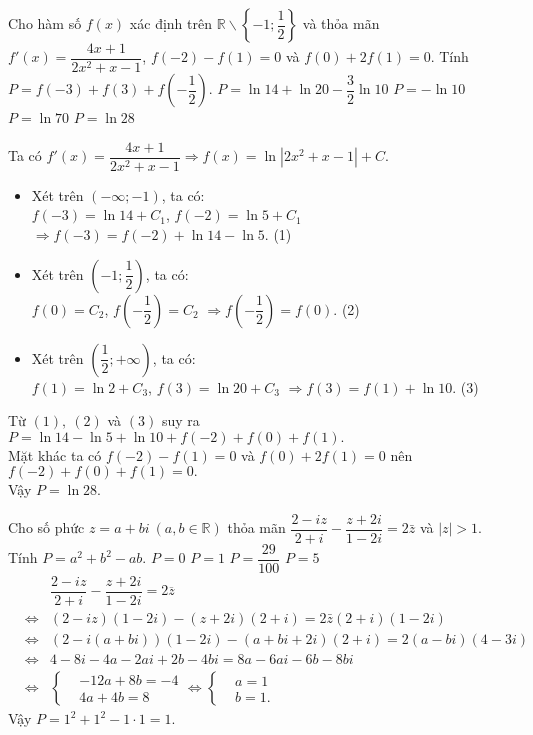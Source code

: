 \documentclass[12pt,a4paper,oneside]{book}
\newcommand{\heva}[1]{
	\left\{\begin{aligned}#1\end{aligned}\right.}
\begin{document}
\begin{ex}%
Cho hàm số $ f(x) $ xác định trên $ \mathbb{R} \backslash \left\{-1;\dfrac{1}{2}\right\} $ và thỏa mãn $ f'(x)=\dfrac{4x+1}{2x^2+x-1} $, $ f(-2)-f(1)=0 $ và $ f(0)+2f(1)=0. $ Tính $ P = f(-3)+f(3)+f\left(-\dfrac{1}{2}\right) $.
	\choice
	{$ P = \ln 14 + \ln 20 - \dfrac{3}{2}\ln 10 $}
	{$ P = -\ln 10 $}
	{$ P =\ln 70 $}
	{\True $ P = \ln 28 $}
	\loigiai
	{Ta có $ f'(x)=\dfrac{4x+1}{2x^2+x-1} \Rightarrow f(x) = \ln \left|2x^2+x-1\right| +C.$
		\begin{itemize}
			\item Xét trên $ \left(-\infty;-1\right) $, ta có:\\
			$ f(-3)=\ln 14 +C_1 $, $ f(-2)=\ln 5 + C_1 $ $ \Rightarrow f(-3) = f(-2) + \ln 14 - \ln 5. $ \hfill (1)
			\item Xét trên $ \left(-1;\dfrac{1}{2}\right) $, ta có:\\
			$ f(0)=C_2 $, $ f\left(-\dfrac{1}{2}\right)= C_2 $ $ \Rightarrow f\left(-\dfrac{1}{2}\right) = f(0). $ \hfill (2)
			\item Xét trên $ \left(\dfrac{1}{2};+\infty\right) $, ta có:\\
			$ f(1)=\ln 2 +C_3 $, $ f(3)=\ln 20 + C_3 $ $ \Rightarrow f(3) = f(1) + \ln 10. $ \hfill (3)
		\end{itemize}
Từ $ (1),\ (2) $ và $ (3) $ suy ra $ P = \ln 14 - \ln 5 + \ln 10 + f(-2) + f(0) + f(1). $\\
Mặt khác ta có $ f(-2)-f(1)=0 $ và $ f(0)+2f(1)=0 $ nên $ f(-2)+f(0)+f(1) = 0. $\\
Vậy $ P = \ln 28.  $
	}
\end{ex}
\begin{ex}%
Cho số phức	$ z = a+bi \ (a,b \in \mathbb{R}) $ thỏa mãn $ \dfrac{2-iz}{2+i}-\dfrac{z+2i}{1-2i}=2 \bar{z} $ và $ \left|z\right| >1$. Tính $ P = a^2 + b^2-ab. $
	\choice
	{$ P = 0 $}
	{\True $ P = 1 $}
	{$ P = \dfrac{29}{100} $}
	{$ P =5 $}
	\loigiai
	{\begin{eqnarray*}
&&\dfrac{2-iz}{2+i}-\dfrac{z+2i}{1-2i}=2 \overline{z} \\
&\Leftrightarrow& \left(2-iz\right)\left(1-2i\right)-(z+2i)(2+i)=2\bar{z}(2+i)(1-2i)\\
&\Leftrightarrow& \left(2-i(a+bi)\right)(1-2i)-(a+bi+2i)(2+i)=2(a-bi)(4-3i)\\
&\Leftrightarrow& 4-8i-4a-2ai+2b-4bi=8a-6ai-6b-8bi\\
&\Leftrightarrow& \heva{&-12a +8b=-4\\&4a+4b=8} \Leftrightarrow \heva{&a=1\\&b=1.}
	\end{eqnarray*}
Vậy $ P = 1^2 + 1^2 - 1 \cdot 1 = 1. $
}
\end{ex}
\end{document}
